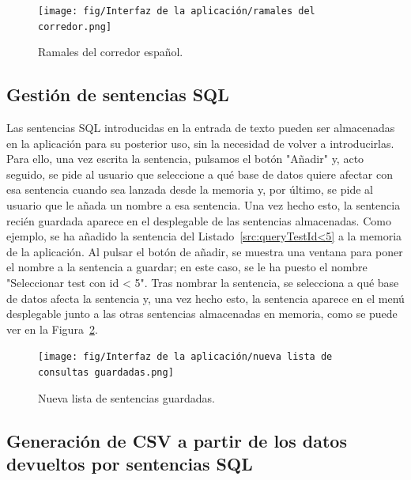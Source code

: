 \begin{figure}[H]
    \centering
    \texttt{[image: fig/Interfaz de la aplicación/ramales del corredor.png]}
    \caption{Ramales del corredor español.}
    \label{fig:corridorPaths}
\end{figure}

\subsection{Gestión de sentencias \acrshort{SQL}}
\label{PreubasGestionSQL}

Las sentencias \acrshort{SQL} introducidas en la entrada de texto pueden ser almacenadas en la aplicación para su posterior uso, sin la necesidad de volver a introducirlas. Para ello, una vez escrita la sentencia, pulsamos el botón "Añadir" y, acto seguido, se pide al usuario que seleccione a qué base de datos quiere afectar con esa sentencia cuando sea lanzada desde la memoria y, por último, se pide al usuario que le añada un nombre a esa sentencia. Una vez hecho esto, la sentencia recién guardada aparece en el desplegable de las sentencias almacenadas. Como ejemplo, se ha añadido la sentencia del Listado~\ref{src:queryTestId<5} a la memoria de la aplicación. Al pulsar el botón de añadir, se muestra una ventana para poner el nombre a la sentencia a guardar; en este caso, se le ha puesto el nombre "Seleccionar test con id < 5". Tras nombrar la sentencia, se selecciona a qué base de datos afecta la sentencia y, una vez hecho esto, la sentencia aparece en el menú desplegable junto a las otras sentencias almacenadas en memoria, como se puede ver en la Figura~\ref{fig:queryTestId<5Saved}.

\begin{figure}[H]
    \centering
    \texttt{[image: fig/Interfaz de la aplicación/nueva lista de consultas guardadas.png]}
    \caption{Nueva lista de sentencias guardadas.}
    \label{fig:queryTestId<5Saved}
\end{figure}

\subsection{Generación de \acrshort{CSV} a partir de los datos devueltos por sentencias \acrshort{SQL}}

